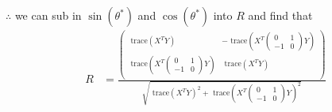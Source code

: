 $\therefore$ we can sub in $\sin(\theta^*)$ and $\cos(\theta^*)$ into $R$ and find that\\
\begin{align*}
R &= \frac{
\begin{pmatrix}
\text{ trace}(X^T Y) & -\text{ trace}(X^T \begin{pmatrix} 0 & 1 \\ -1 & 0 \end{pmatrix} Y) \\
\text{ trace}(X^T \begin{pmatrix} 0 & 1 \\ -1 & 0 \end{pmatrix} Y)  & \text{ trace}(X^T Y) \\
\end{pmatrix}}{\sqrt{\text{ trace}(X^TY)^2 + \text{ trace}(X^T \begin{pmatrix} 0 & 1 \\ -1 & 0 \end{pmatrix} Y)^2}}
\end{align*}

